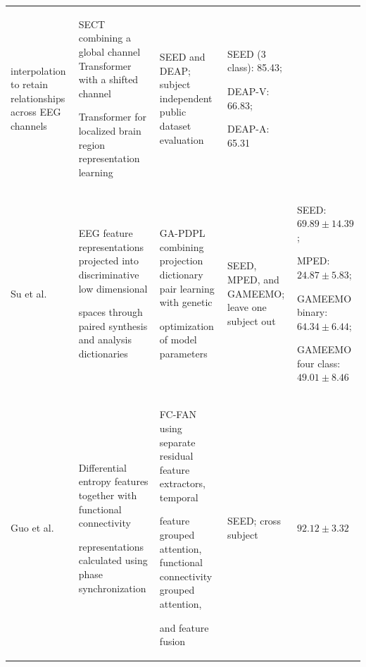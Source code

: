 \documentclass[ASNA,twocolumn]{USG}
\newcommand{\lightrowsep}{%
  \arrayrulecolor{lightrowgray}%
  \specialrule{0.30pt}{3.5pt}{3.5pt}%
  \arrayrulecolor{black}%
}
\begin{document}
\begin{table}
\begin{tabularx}{\textheight}{>{\raggedright\arraybackslash}p{3.15cm}>{\raggedright\arraybackslash}X>{\raggedright\arraybackslash}X>{\raggedright\arraybackslash}p{3.45cm}>{\raggedright\arraybackslash}p{5.0cm}}
interpolation to retain relationships across EEG channels &

SECT combining a global channel Transformer with a shifted channel

Transformer for localized brain region representation learning &

SEED and DEAP; subject independent public dataset evaluation &

SEED (3 class): 85.43;

DEAP-V: 66.83;

DEAP-A: 65.31 \\

\lightrowsep

Su et al. \cite{su2023subject} &

EEG feature representations projected into discriminative low dimensional

spaces through paired synthesis and analysis dictionaries &

GA-PDPL combining projection dictionary pair learning with genetic

optimization of model parameters &

SEED, MPED, and GAMEEMO; leave one subject out &

SEED: $69.89 \pm 14.39$;

MPED: $24.87 \pm 5.83$;

GAMEEMO binary: $64.34 \pm 6.44$;

GAMEEMO four class: $49.01 \pm 8.46$ \\

\lightrowsep

Guo et al. \cite{guo2024functional} &

Differential entropy features together with functional connectivity

representations calculated using phase synchronization &

FC-FAN using separate residual feature extractors, temporal

feature grouped attention, functional connectivity grouped attention,

and feature fusion &

SEED; cross subject &

$92.12 \pm 3.32$ \\

\bottomrule

\end{tabularx}

\end{table}
\end{document}
